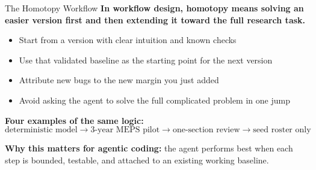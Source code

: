 \documentclass[10pt,english,aspectratio=169]{beamer}
\begin{document}
\begin{frame}{The Homotopy Workflow}
\textbf{In workflow design, homotopy means solving an easier version first and then extending it toward the full research task.}

\vspace{0.25cm}

\begin{itemize}
    \item Start from a version with clear intuition and known checks
    \item Use that validated baseline as the starting point for the next version
    \item Attribute new bugs to the new margin you just added
    \item Avoid asking the agent to solve the full complicated problem in one jump
\end{itemize}

\vspace{0.3cm}

\textbf{Four examples of the same logic:}
\[
    \text{deterministic model}
    \rightarrow
    \text{3-year MEPS pilot}
    \rightarrow
    \text{one-section review}
    \rightarrow
    \text{seed roster only}
\]

\vspace{0.15cm}

\textbf{Why this matters for agentic coding:} the agent performs best when each step is bounded, testable, and attached to an existing working baseline.
\end{frame}
\end{document}
